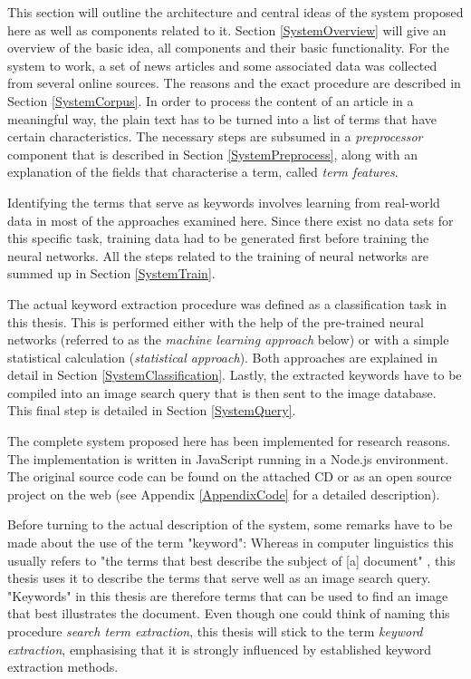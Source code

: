 \documentclass[11pt,a4paper,twoside]{article}
\begin{document}
This section will outline the architecture and central ideas of the system proposed here as well as components related to it. Section \ref{SystemOverview} will give an overview of the basic idea, all components and their basic functionality. For the system to work, a set of news articles and some associated data was collected from several online sources. The reasons and the exact procedure are described in Section \ref{SystemCorpus}. In order to process the content of an article in a meaningful way, the plain text has to be turned into a list of terms that have certain characteristics. The necessary steps are subsumed in a \emph{preprocessor} component that is described in Section \ref{SystemPreprocess}, along with an explanation of the fields that characterise a term, called \emph{term features}.

Identifying the terms that serve as keywords involves learning from real-world data in most of the approaches examined here. Since there exist no data sets for this specific task, training data had to be generated first before training the neural networks. All the steps related to the training of neural networks are summed up in Section \ref{SystemTrain}.

The actual keyword extraction procedure was defined as a classification task in this thesis. This is performed either with the help of the pre-trained neural networks (referred to as the \emph{machine learning approach} below) or with a simple statistical calculation (\emph{statistical approach}). Both approaches are explained in detail in Section \ref{SystemClassification}. Lastly, the extracted keywords have to be compiled into an image search query that is then sent to the image database. This final step is detailed in Section \ref{SystemQuery}.

The complete system proposed here has been implemented for research reasons. The implementation is written in JavaScript running in a Node.js environment. The original source code can be found on the attached CD or as an open source project on the web (see Appendix \ref{AppendixCode} for a detailed description).

Before turning to the actual description of the system, some remarks have to be made about the use of the term "keyword": Whereas in computer linguistics this usually refers to "the terms that best describe the subject of [a] document" \cite[p. 1]{BeligaKeywordApproaches}, this thesis uses it to describe the terms that serve well as an image search query. "Keywords" in this thesis are therefore terms that can be used to find an image that best illustrates the document. Even though one could think of naming this procedure \emph{search term extraction}, this thesis will stick to the term \emph{keyword extraction}, emphasising that it is strongly influenced by established keyword extraction methods.
\end{document}
